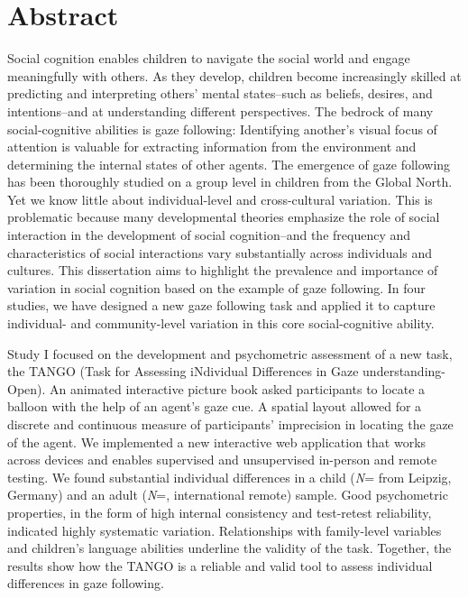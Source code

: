 \documentclass[
]{scrbook}
\begin{document}
\chapter{Abstract}\label{abstract}

Social cognition enables children to navigate the social world and engage meaningfully with others.
As they develop, children become increasingly skilled at predicting and interpreting others' mental states\thinspace --\thinspace such as beliefs, desires, and intentions\thinspace --\thinspace and at understanding different perspectives.
The bedrock of many social-cognitive abilities is gaze following: Identifying another's visual focus of attention is valuable for extracting information from the environment and determining the internal states of other agents. The emergence of gaze following has been thoroughly studied on a group level in children from the Global North. Yet we know little about individual-level and cross-cultural variation. This is problematic because many developmental theories emphasize the role of social interaction in the development of social cognition\thinspace --\thinspace and the frequency and characteristics of social interactions vary substantially across individuals and cultures. This dissertation aims to highlight the prevalence and importance of variation in social cognition based on the example of gaze following. In four studies, we have designed a new gaze following task and applied it to capture individual- and community-level variation in this core social-cognitive ability.

Study I focused on the development and psychometric assessment of a new task, the TANGO (Task for Assessing iNdividual Differences in Gaze understanding-Open). An animated interactive picture book asked participants to locate a balloon with the help of an agent's gaze cue. A spatial layout allowed for a discrete and continuous measure of participants' imprecision in locating the gaze of the agent. We implemented a new interactive web application that works across devices and enables supervised and unsupervised in-person and remote testing. We found substantial individual differences in a child (\emph{N}\thinspace= from Leipzig, Germany) and an adult (\emph{N}\thinspace =, international remote) sample. Good psychometric properties, in the form of high internal consistency and test-retest reliability, indicated highly systematic variation. Relationships with family-level variables and children's language abilities underline the validity of the task. Together, the results show how the TANGO is a reliable and valid tool to assess individual differences in gaze following.
\end{document}
